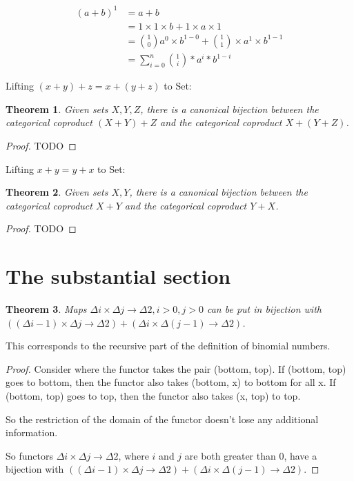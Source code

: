 \documentclass{proc-l}
\newtheorem{theorem}{Theorem}[section]
\theoremstyle{definition}
\theoremstyle{remark}
\numberwithin{equation}{section}
\begin{document}
\begin{align*}
(a + b)^1 & = a + b \\ %
& = 1 \times 1 \times b + 1 \times a \times 1 \\ %
& = {1 \choose 0} a^0 \times b^{1-0} + {1 \choose 1} \times a^1 \times b^{1-1} \\ %
& = \sum_{i=0}^n {1 \choose i} * a^i * b^{1-i} %
\end{align*}



Lifting \((x + y) + z = x + (y + z)\) to Set:

\begin{theorem}
Given sets \(X, Y, Z\), there is a canonical bijection between the categorical coproduct \((X + Y) + Z\) and the categorical coproduct \(X + (Y + Z)\).
\end{theorem}

\begin{proof}
TODO
\end{proof} 


Lifting \(x + y = y + x\) to Set:

\begin{theorem}
Given sets \(X, Y\), there is a canonical bijection between the categorical coproduct \(X + Y\) and the categorical coproduct \(Y + X\).
\end{theorem}

\begin{proof}
TODO
\end{proof}

\section{The substantial section}

\begin{theorem}
Maps \(\Delta i \times \Delta j \to \Delta 2, i > 0, j > 0\) can be put in bijection with \(((\Delta i-1) \times \Delta j \to \Delta 2) + (\Delta i \times \Delta (j-1) \to \Delta 2)\).
\end{theorem}

This corresponds to the recursive part of the definition of binomial numbers.

\begin{proof}
Consider where the functor takes the pair (bottom, top). If (bottom, top) goes to bottom, then the functor also takes (bottom, x) to bottom for all x. If (bottom, top) goes to top, then the functor also takes (x, top) to top.

So the restriction of the domain of the functor doesn't lose any additional information.

So functors \(\Delta i \times \Delta j \to \Delta 2\), where \(i\) and \(j\) are both greater than 0, have a bijection with \(((\Delta i-1) \times \Delta j \to \Delta 2) + (\Delta i \times \Delta (j-1) \to \Delta 2)\). 
\end{proof}
\end{document}
